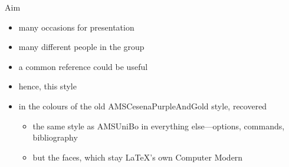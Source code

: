 \begin{frame}[c]{Aim}
%
\begin{itemize}
	\item many occasions for presentation
	\item many different people in the group
	\item a common reference could be useful
	\item hence, this style
	\item in the colours of the old \alert{AMSCesenaPurpleAndGold} style, recovered
	\begin{itemize}
		\item the same style as \alert{AMSUniBo} in everything else---options, commands, bibliography
		\item but the faces, which stay \LaTeX{}'s own Computer Modern
	\end{itemize}
\end{itemize}
%
\end{frame}

